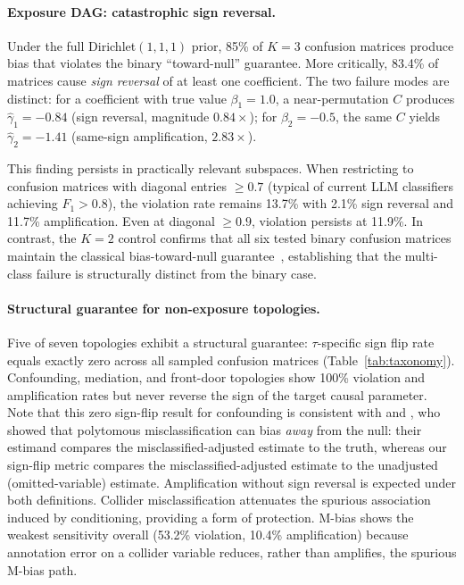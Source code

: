 \paragraph{Exposure DAG: catastrophic sign reversal.}
Under the full Dirichlet$(1,1,1)$ prior, 85\% of $K{=}3$ confusion matrices produce bias that violates the binary ``toward-null'' guarantee. More critically, 83.4\% of matrices cause \emph{sign reversal} of at least one coefficient. The two failure modes are distinct: for a coefficient with true value $\beta_1{=}1.0$, a near-permutation $C$ produces $\hat{\gamma}_1{=}{-}0.84$ (sign reversal, magnitude $0.84{\times}$); for $\beta_2{=}{-}0.5$, the same $C$ yields $\hat{\gamma}_2{=}{-}1.41$ (same-sign amplification, $2.83{\times}$).

This finding persists in practically relevant subspaces. When restricting to confusion matrices with diagonal entries $\geq 0.7$ (typical of current LLM classifiers achieving $F_1 > 0.8$), the violation rate remains 13.7\% with 2.1\% sign reversal and 11.7\% amplification. Even at diagonal $\geq 0.9$, violation persists at 11.9\%. In contrast, the $K{=}2$ control confirms that all six tested binary confusion matrices maintain the classical bias-toward-null guarantee~\cite{brenner1993}, establishing that the multi-class failure is structurally distinct from the binary case.

\paragraph{Structural guarantee for non-exposure topologies.}
Five of seven topologies exhibit a structural guarantee: $\tau$-specific sign flip rate equals exactly zero across all sampled confusion matrices (Table~\ref{tab:taxonomy}). Confounding, mediation, and front-door topologies show 100\% violation and amplification rates but never reverse the sign of the target causal parameter. Note that this zero sign-flip result for confounding is consistent with \citet{brenner1993} and \citet{dosemeci1990}, who showed that polytomous misclassification can bias \emph{away} from the null: their estimand compares the misclassified-adjusted estimate to the truth, whereas our sign-flip metric compares the misclassified-adjusted estimate to the unadjusted (omitted-variable) estimate. Amplification without sign reversal is expected under both definitions. Collider misclassification attenuates the spurious association induced by conditioning, providing a form of protection. M-bias shows the weakest sensitivity overall (53.2\% violation, 10.4\% amplification) because annotation error on a collider variable reduces, rather than amplifies, the spurious M-bias path.

